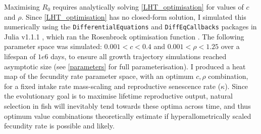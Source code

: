 \documentclass[a4paper]{article} %
\begin{document}
Maximising $R_0$ requires analytically solving \cref{LHT_optimisation} for values of $c$ and $\rho$. Since \cref{LHT_optimisation} has no closed-form solution, I simulated this numerically using the \texttt{DifferentialEquations} and \texttt{DiffEqCallbacks} packages in Julia v1.1.1 \autocite{Bezanson2017}, which ran the Rosenbrock optimisation function \autocite{Rosenbrock1960}. The following parameter space was simulated: $0.001 < c < 0.4$ \autocite{Roff1983, Enberg2008, Atiqulla2013} and $0.001 < \rho < 1.25$ over a lifespan of $1e6$ days, to ensure all growth trajectory simulations reached asymptotic size (see \cref{parameters} for full parameterisation). I produced a heat map of the fecundity rate parameter space, with an optimum $c, \rho$ combination, for a fixed intake rate mass-scaling and reproductive senescence rate ($\kappa$). Since the evolutionary goal is to maximise lifetime reproductive output, natural selection in fish will inevitably tend towards these optima across time, and thus optimum value combinations theoretically estimate if hyperallometrically scaled fecundity rate is possible and likely.
\end{document}
